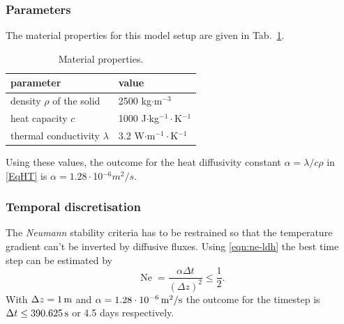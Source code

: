 \subsubsection{Parameters}

The material properties for this model setup are given in Tab.~\ref{tab-ldhp}.
\begin{table}[h]%
\caption{\label{tab-ldhp}Material properties.}
\begin{center}
\begin{tabular}{ll}
\toprule
parameter & value \\
\midrule
density $\rho$ of the solid & 2500  kg$\cdot$m$^{-3}$ \\			
heat capacity	$c$	    & 1000  J$\cdot$kg$^{-1}\cdot$K$^{-1}$ \\
thermal conductivity $\lambda$	& 3.2  W$\cdot$m$^{-1}\cdot$K$^{-1}$ \\
\bottomrule
\end{tabular}
\end{center}
\end{table}
Using these values, the outcome for the heat diffusivity constant $\alpha = \lambda/c\rho$ in \eqref{EqHT} is $\alpha=1.28\cdot$10$^{-6}m^2/s$.
\subsubsection{Temporal discretisation}

The \textit{Neumann} stability criteria has to be restrained so that the temperature gradient can't be inverted by diffusive fluxes. Using \eqref{eqn:ne-ldh} the best time step can be estimated by
\begin{equation}
\operatorname{Ne} = \frac{\alpha\Delta t}{(\Delta z)^2}\leq\frac{1}{2}.
\label{eqn:ne-ldh}
\end{equation}
With $\Delta z=\unit[1]{m}$ and $\alpha=\unit[1.28 \cdot 10^{-6}]{m^2/s}$ the outcome for the timestep is $\Delta t\leq \unit[390.625]{s}$ or 4.5 days respectively.
